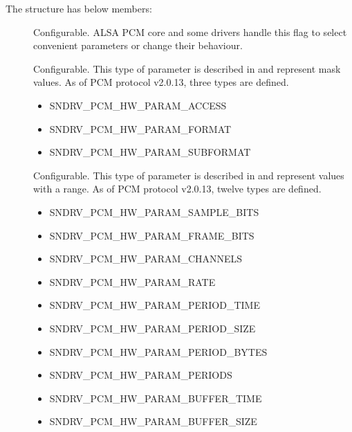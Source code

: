 \documentclass[a4paper,8pt,english]{sphinxmanual}
\begin{document}
The  structure has below members:
\begin{description}
\item[{}] \leavevmode
Configurable. ALSA PCM core and some drivers handle this flag to select
convenient parameters or change their behaviour.

\item[{}] \leavevmode
Configurable. This type of parameter is described in
 and represent mask values. As of PCM protocol
v2.0.13, three types are defined.
\begin{itemize}
\item {} 
SNDRV\_PCM\_HW\_PARAM\_ACCESS

\item {} 
SNDRV\_PCM\_HW\_PARAM\_FORMAT

\item {} 
SNDRV\_PCM\_HW\_PARAM\_SUBFORMAT

\end{itemize}

\item[{}] \leavevmode
Configurable. This type of parameter is described in
 and represent values with a range. As of
PCM protocol v2.0.13, twelve types are defined.
\begin{itemize}
\item {} 
SNDRV\_PCM\_HW\_PARAM\_SAMPLE\_BITS

\item {} 
SNDRV\_PCM\_HW\_PARAM\_FRAME\_BITS

\item {} 
SNDRV\_PCM\_HW\_PARAM\_CHANNELS

\item {} 
SNDRV\_PCM\_HW\_PARAM\_RATE

\item {} 
SNDRV\_PCM\_HW\_PARAM\_PERIOD\_TIME

\item {} 
SNDRV\_PCM\_HW\_PARAM\_PERIOD\_SIZE

\item {} 
SNDRV\_PCM\_HW\_PARAM\_PERIOD\_BYTES

\item {} 
SNDRV\_PCM\_HW\_PARAM\_PERIODS

\item {} 
SNDRV\_PCM\_HW\_PARAM\_BUFFER\_TIME

\item {} 
SNDRV\_PCM\_HW\_PARAM\_BUFFER\_SIZE


\end{itemize}
\end{description}
\end{document}
